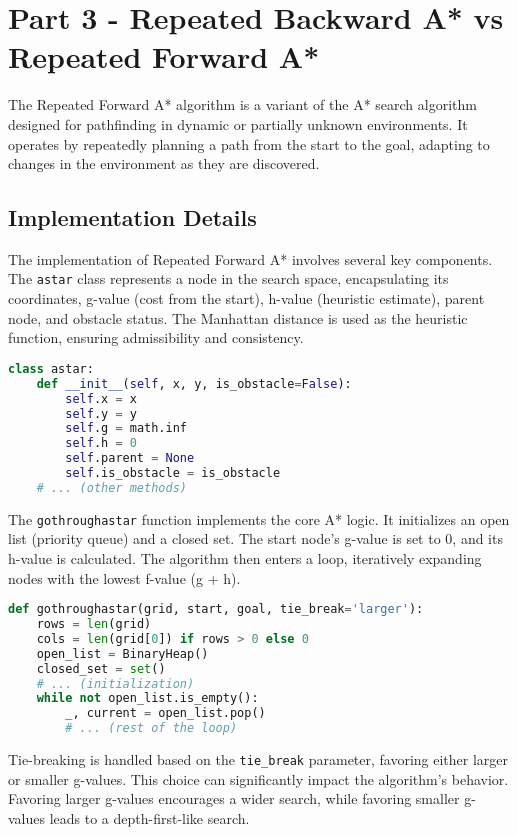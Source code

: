 \documentclass[12pt]{article}
\begin{document}
\section{Part 3 - Repeated Backward A* vs Repeated Forward A*}

The Repeated Forward A* algorithm is a variant of the A* search algorithm designed for pathfinding in dynamic or partially unknown environments. 
It operates by repeatedly planning a path from the start to the goal, 
adapting to changes in the environment as they are discovered.

\subsection{Implementation Details}

The implementation of Repeated Forward A* involves several key components. 
The \texttt{astar} class represents a node in the search space, 
encapsulating its coordinates, 
g-value (cost from the start), 
h-value (heuristic estimate), 
parent node, 
and obstacle status. 
The Manhattan distance is used as the heuristic function, 
ensuring admissibility and consistency.

\begin{lstlisting}[language=Python, basicstyle=\ttfamily]
class astar:
    def __init__(self, x, y, is_obstacle=False):
        self.x = x
        self.y = y
        self.g = math.inf
        self.h = 0
        self.parent = None
        self.is_obstacle = is_obstacle
    # ... (other methods)
\end{lstlisting}

The \texttt{gothroughastar} function implements the core A* logic. 
It initializes an open list 
(priority queue) 
and a closed set. The start node's g-value is set to 0, 
and its h-value is calculated. 
The algorithm then enters a loop, 
iteratively expanding nodes with the lowest f-value (g + h).

\begin{lstlisting}[language=Python, basicstyle=\ttfamily]
def gothroughastar(grid, start, goal, tie_break='larger'):
    rows = len(grid)
    cols = len(grid[0]) if rows > 0 else 0
    open_list = BinaryHeap()
    closed_set = set()
    # ... (initialization)
    while not open_list.is_empty():
        _, current = open_list.pop()
        # ... (rest of the loop)
\end{lstlisting}

Tie-breaking is handled based on the \texttt{tie\_break} parameter, 
favoring either larger or smaller g-values. 
This choice can significantly impact the algorithm's behavior. 
Favoring larger g-values encourages a wider search, 
while favoring smaller g-values leads to a depth-first-like search.
\end{document}
